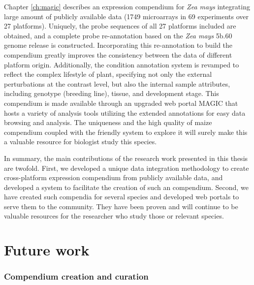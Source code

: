 Chapter \ref{ch:magic} describes an expression compendium for \textit{Zea mays} 
integrating large amount of publicly available data (1749 microarrays in 69 
experiments over 27 platforms). 
%
Uniquely, the probe sequences of all 27 platforms included are obtained, and a 
complete probe re-annotation based on the \textit{Zea mays} 5b.60 genome 
release 
is constructed.  Incorporating this re-annotation to build the compendium 
greatly improves the consistency between the data of different platform origin.
%
Additionally, the condition annotation system is revamped to reflect the 
complex lifestyle of plant, specifying not only the external perturbations 
at the contrast level, but also the internal sample attributes, including 
genotype (breeding line), tissue, and development stage.
%
This compendium is made available through an upgraded web portal MAGIC that 
hosts a variety of analysis tools utilizing the extended annotations for 
easy data browsing and analysis.
%
The uniqueness and the high quality of maize compendium coupled with the 
friendly system to explore it will surely make this a valuable resource for 
biologist study this species.


In summary, the main contributions of the research work presented in this 
thesis are twofold.
%
First, we developed a unique data integration methodology to create 
cross-platform expression compendium from publicly available data, and 
developed a system to facilitate the creation of such an compendium.
%
Second, we have created such compendia for several species and developed web 
portals to serve them to the community.  They have been proven and will 
continue to be valuable resources for the researcher who study those or 
relevant species.














\section{Future work}



\subsubsection*{Compendium creation and curation}


